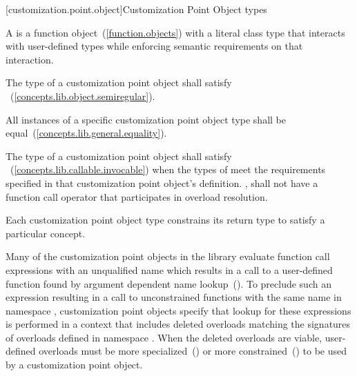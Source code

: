 \setcounter{paragraph}{5}
\begin{addedblock}
[customization.point.object]{Customization Point Object types}

\pnum
A  is a function object~(\ref{function.objects}) with a
literal class type that interacts with user-defined types while
enforcing semantic requirements on that interaction.

\pnum
The type of a customization point object shall satisfy
~(\ref{concepts.lib.object.semiregular}).

\pnum
All instances of a specific customization point object type shall
be equal~(\ref{concepts.lib.general.equality}).

\pnum
The type of a customization point object  shall satisfy
~(\ref{concepts.lib.callable.invocable}) when the types of
 meet the requirements specified in that
customization point object's definition. , 
shall not have a function call operator that participates in
overload resolution.

\pnum
Each customization point object type constrains its return type
to satisfy a particular concept.

\pnum
{}

\pnum
\enternote Many of the customization point objects in the library
evaluate function call expressions with an unqualified name which
results in a call to a user-defined function found by argument
dependent name lookup~(). To preclude
such an expression resulting in a call to unconstrained functions
with the same name in namespace , customization point
objects specify that lookup for these expressions is performed in
a context that includes deleted overloads matching the signatures
of overloads defined in namespace . When the deleted
overloads are viable, user-defined overloads must be more
specialized~() or more
constrained~() to be used by a
customization point object. \exitnote
\end{addedblock}

